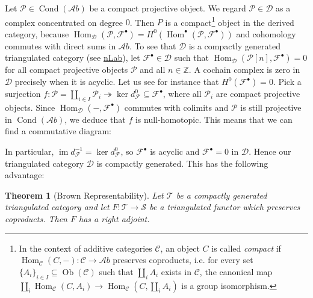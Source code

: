 \documentclass[11pt,A4]{article}
\theoremstyle{plain}
\newtheorem{thm}{Theorem}[section]
\theoremstyle{definition}
\theoremstyle{remark}
\newcommand{\Z}{\mathbb{Z}}
\newcommand{\1}{\mathbbm{1}}
\newcommand{\F}{\mathcal{F}}
\newcommand{\calP}{\mathcal{P}}
\newcommand{\scrC}{\mathscr{C}}
\newcommand{\Ab}{\mathscr{A}b}
\newcommand{\D}{\mathscr{D}}
\DeclareMathOperator{\Hom}{Hom}
\DeclareMathOperator{\Cond}{Cond}
\DeclareMathOperator{\Ob}{Ob}
\DeclareMathOperator{\im}{im}
\newcommand{\grd}{^{\bullet}}
\begin{document}
Let $\calP\in \Cond(\Ab)$ be a compact projective object.
We regard $\calP\in \D$ as a complex concentrated on degree $0$.
Then $P$ is a compact\footnote{In the context of additive categories $\scrC$, an object $C$ is called \textit{compact} if $\Hom_{\scrC}(C,-)\colon \scrC\to \Ab$ preserves coproducts, i.e. for every set $\{A_{i}\}_{i\in I}\subseteq \Ob(\scrC)$ such that $\coprod_{i}A_{i}$ exists in $\scrC$, the canonical map $\coprod_{i}\Hom_{\scrC}(C,A_{i})\to \Hom_{\scrC}(C,\coprod_{i}A_{i})$ is a group isomorphism.} object in the derived category, because $\Hom_{\D}(\calP,\F\grd)=H^{0}(\Hom\grd(\calP,\F\grd))$ and cohomology commutes with direct sums in $\Ab$.
To see that $\D$ is a compactly generated triangulated category (see \href{https://ncatlab.org/nlab/show/compactly+generated+triangulated+category}{nLab}), let $\F\grd\in \D$ such that $\Hom_{\D}(\calP[n],\F\grd)=0$ for all compact projective objects $\calP$ and all $n\in \Z$.
A cochain complex is zero in $\D$ precisely when it is acyclic.
Let us see for instance that $H^{0}(\F\grd)=0$.
Pick a surjection $f\colon \calP=\coprod_{i\in I}\calP_{i}\twoheadrightarrow \ker{d_{\F}^{0}}\subseteq \F\grd$, where all $\calP_{i}$ are compact projective objects.
Since $\Hom_{\D}(-,\F\grd)$ commutes with colimits and $\calP$ is still projective in $\Cond(\Ab)$, we deduce that $f$ is null-homotopic.
This means that we can find a commutative diagram:
\begin{center}
\end{center}
In particular, $\im{d_{\F}^{-1}}=\ker{d_{\F}^{0}}$, so $\F\grd$ is acyclic and $\F\grd=0$ in $\D$.
Hence our triangulated category $\D$ is compactly generated.
This has the following advantage:

\begin{thm}[Brown Representability]
    Let $\mathscr{T}$ be a compactly generated triangulated category and let $F\colon \mathscr{T}\to \mathscr{S}$ be a triangulated functor which preserves coproducts.
    Then $F$ has a right adjoint.
\end{thm}



\end{document}
